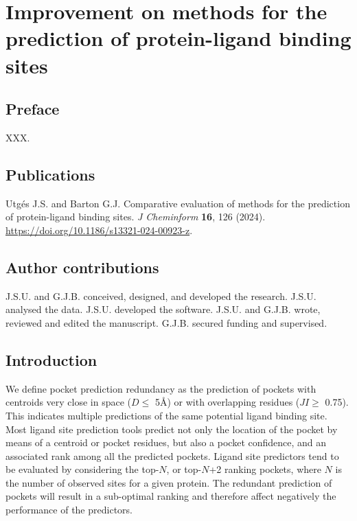 \chapter{Improvement on methods for the prediction of protein-ligand binding sites}

\section*{Preface}

XXX.

\section*{Publications}

Utgés J.S. and Barton G.J. Comparative evaluation of methods for the prediction of protein-ligand binding sites. \textit{J Cheminform} \textbf{16}, 126 (2024). \url{https://doi.org/10.1186/s13321-024-00923-z}. \cite{UTGES_2024_LBSCOMP}

\section*{Author contributions}

J.S.U. and G.J.B. conceived, designed, and developed the research. J.S.U. analysed the data. J.S.U. developed the software. J.S.U. and G.J.B. wrote, reviewed and edited the manuscript. G.J.B. secured funding and supervised.

\section{Introduction}


We define pocket prediction redundancy as the prediction of pockets with centroids very close in space ($D \leq$ 5\AA{}) or with overlapping residues ($JI \geq$ 0.75). This indicates multiple predictions of the same potential ligand binding site. Most ligand site prediction tools predict not only the location of the pocket by means of a centroid or pocket residues, but also a pocket confidence, and an associated rank among all the predicted pockets. Ligand site predictors tend to be evaluated by considering the top-$N$, or top-$N$+2 ranking pockets, where $N$ is the number of observed sites for a given protein. The redundant prediction of pockets will result in a sub-optimal ranking and therefore affect negatively the performance of the predictors.

